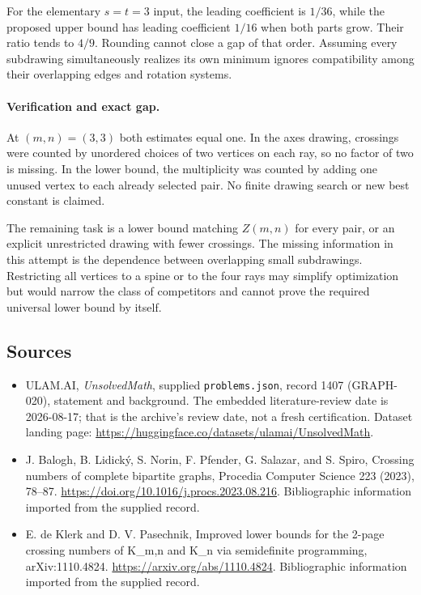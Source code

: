\documentclass[11pt,a4paper]{article}
\begin{document}
For the elementary $s=t=3$ input, the leading coefficient is $1/36$, while the proposed upper bound has leading coefficient $1/16$ when both parts grow. Their ratio tends to $4/9$. Rounding cannot close a gap of that order. Assuming every subdrawing simultaneously realizes its own minimum ignores compatibility among their overlapping edges and rotation systems.

\paragraph{Verification and exact gap.}
At $(m,n)=(3,3)$ both estimates equal one. In the axes drawing, crossings were counted by unordered choices of two vertices on each ray, so no factor of two is missing. In the lower bound, the multiplicity was counted by adding one unused vertex to each already selected pair. No finite drawing search or new best constant is claimed.

The remaining task is a lower bound matching $Z(m,n)$ for every pair, or an explicit unrestricted drawing with fewer crossings. The missing information in this attempt is the dependence between overlapping small subdrawings. Restricting all vertices to a spine or to the four rays may simplify optimization but would narrow the class of competitors and cannot prove the required universal lower bound by itself.

\subsection{Sources}

{\small

\begin{itemize}

\item[\hypertarget{source:1407:1}{S1}] ULAM.AI, \emph{UnsolvedMath}, supplied \texttt{problems.json}, record 1407 (GRAPH-020), statement and background. The embedded literature-review date is 2026-08-17; that is the archive’s review date, not a fresh certification. Dataset landing page: \url{https://huggingface.co/datasets/ulamai/UnsolvedMath}.

\item[\hypertarget{source:1407:2}{S2}] J. Balogh, B. Lidický, S. Norin, F. Pfender, G. Salazar, and S. Spiro, Crossing numbers of complete bipartite graphs, Procedia Computer Science 223 (2023), 78–87. \url{https://doi.org/10.1016/j.procs.2023.08.216}. Bibliographic information imported from the supplied record.

\item[\hypertarget{source:1407:3}{S3}] E. de Klerk and D. V. Pasechnik, Improved lower bounds for the 2-page crossing numbers of K\_{m,n} and K\_n via semidefinite programming, arXiv:1110.4824. \url{https://arxiv.org/abs/1110.4824}. Bibliographic information imported from the supplied record.

\end{itemize}

}

\label{end:1407}
\end{document}
